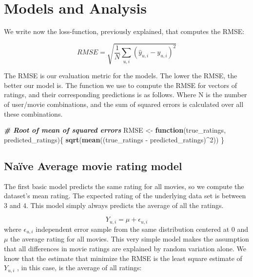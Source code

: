 \documentclass[
]{article}
\newenvironment{Shaded}{\begin{snugshade}}{\end{snugshade}}
\newcommand{\CommentTok}[1]{\textcolor[rgb]{0.00,0.40,1.00}{\textbf{\textit{#1}}}}
\newcommand{\ControlFlowTok}[1]{\textcolor[rgb]{0.26,0.66,0.93}{\textbf{#1}}}
\newcommand{\DecValTok}[1]{\textcolor[rgb]{0.27,0.67,0.26}{#1}}
\newcommand{\KeywordTok}[1]{\textcolor[rgb]{0.26,0.66,0.93}{\textbf{#1}}}
\newcommand{\NormalTok}[1]{\textcolor[rgb]{0.74,0.68,0.62}{#1}}
\newcommand{\OperatorTok}[1]{\textcolor[rgb]{0.74,0.68,0.62}{#1}}
\newcommand{\StringTok}[1]{\textcolor[rgb]{0.02,0.61,0.04}{#1}}
\begin{document}
\hypertarget{models-and-analysis}{%
\section{Models and Analysis}\label{models-and-analysis}}

We write now the loss-function, previously explained, that computes the
RMSE:

\[ RMSE = \sqrt{\frac{1}{N}\displaystyle\sum_{u,i} (\hat{y}_{u,i}-y_{u,i})^{2}} \]

The RMSE is our evaluation metric for the models. The lower the RMSE,
the better our model is. The function we use to compute the RMSE for
vectors of ratings, and their corresponding predictions is as follows.
Where N is the number of user/movie combinations, and the sum of squared
errors is calculated over all these combinations.

\begin{Shaded}
\begin{Highlighting}[]
\CommentTok{# Root of mean of squared errors}
\NormalTok{RMSE <-}\StringTok{ }\ControlFlowTok{function}\NormalTok{(true_ratings, predicted_ratings)\{}
  \KeywordTok{sqrt}\NormalTok{(}\KeywordTok{mean}\NormalTok{((true_ratings }\OperatorTok{-}\StringTok{ }\NormalTok{predicted_ratings)}\OperatorTok{^}\DecValTok{2}\NormalTok{))}
\NormalTok{\}}
\end{Highlighting}
\end{Shaded}

\hypertarget{nauxefve-average-movie-rating-model}{%
\subsection{Naïve Average movie rating
model}\label{nauxefve-average-movie-rating-model}}

The first basic model predicts the same rating for all movies, so we
compute the dataset's mean rating. The expected rating of the underlying
data set is between 3 and 4. This model simply always predicts the
average of all the ratings.

\[ Y_{u, i} = \mu + \epsilon_{u, i} \] where \(\epsilon_{u,i}\)
independent error sample from the same distribution centered at 0 and
\(\mu\) the average rating for all movies. This very simple model makes
the assumption that all differences in movie ratings are explained by
random variation alone. We know that the estimate that minimize the RMSE
is the least square estimate of \(Y_{u,i}\) , in this case, is the
average of all ratings:
\end{document}
